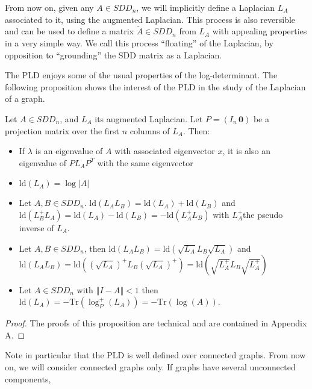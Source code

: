 From now on, given any $A\in SDD_{n}$, we will implicitly define
a Laplacian $L_{A}$ associated to it, using the augmented Laplacian.
This process is also reversible and can be used to define a matrix
$\tilde{A}\in SDD_{n}$ from $L_{A}$ with appealing properties in
a very simple way. We call this process ``floating'' of the Laplacian,
by opposition to ``grounding'' the SDD matrix as a Laplacian. 

The PLD enjoys some of the usual properties of the log-determinant.
The following proposition shows the interest of the PLD in the study
of the Laplacian of a graph. 

\begin{proposition} \label{pro:pld-properties}Let $A\in SDD_{n}$,
and $L_{A}$ its augmented Laplacian. Let $P=\left(I_{n}\,\mathbf{0}\right)$
be a projection matrix over the first $n$ columns of $L_{A}$. Then:\end{proposition} 
\begin{itemize}
\item If $\lambda$ is an eigenvalue of $A$ with associated eigenvector
$x$, it is also an eigenvalue of $PL_{A}P^{T}$ with the same eigenvector 
\item $\text{ld}\left(L_{A}\right)=\log\left|A\right|$ 
\item Let $A,B\in SDD_{n}$. $\text{ld}\left(L_{A}L_{B}\right)=\text{ld}\left(L_{A}\right)+\text{ld}\left(L_{B}\right)$
and $\text{ld}\left(L_{B}^{+}L_{A}\right)=\text{ld}\left(L_{A}\right)-\text{ld}\left(L_{B}\right)=-\text{ld}\left(L_{A}^{+}L_{B}\right)$
with $L_{A}^{+}$the pseudo inverse of $L_{A}$. 
\item Let $A,B\in SDD_{n}$, then $\text{ld}\left(L_{A}L_{B}\right)=\text{ld}\left(\sqrt{L_{A}}L_{B}\sqrt{L_{A}}\right)$
and $\text{ld}\left(L_{A}L_{B}\right)=\text{ld}\left(\left(\sqrt{L_{A}}\right)^{+}L_{B}\left(\sqrt{L_{A}}\right)^{+}\right)=\text{ld}\left(\sqrt{L_{A}^{+}}L_{B}\sqrt{L_{A}^{+}}\right)$ 
\item Let $A\in SDD_{n}$ with $\left\Vert I-A\right\Vert <1$ then $\mbox{ld}\left(L_{A}\right)=-\mbox{Tr}\left(\log_{P}^{+}\left(L_{A}\right)\right)=-\mbox{Tr}\left(\log\left(A\right)\right)$.
\end{itemize}
\begin{proof} The proofs of this proposition are technical and are
contained in Appendix A. \end{proof} Note in particular that the
PLD is well defined over connected graphs. From now on, we will consider
connected graphs only. If graphs have several unconnected components,
